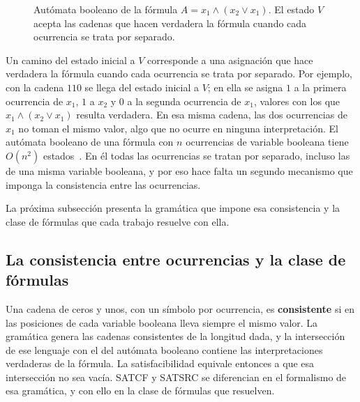 \begin{figure}[ht]
\centering
{}
\caption[Autómata booleano de $A = x_1 \wedge (x_2 \vee x_1)$]{Autómata booleano de la fórmula $A = x_1 \wedge (x_2 \vee
x_1)$. El estado $V$ acepta las cadenas que hacen verdadera la fórmula
cuando cada ocurrencia se trata por separado.}
\label{fig:automata-booleano}
\end{figure}

Un camino del estado inicial a $V$ corresponde a una asignación que hace
verdadera la fórmula cuando cada ocurrencia se trata por separado. Por
ejemplo, con la cadena $110$ se llega del estado inicial a $V$; en ella
se asigna $1$ a la primera ocurrencia de $x_1$, $1$ a $x_2$ y $0$ a la
segunda ocurrencia de $x_1$, valores con los que $x_1 \wedge (x_2 \vee
x_1)$ resulta verdadera. En esa misma cadena, las dos ocurrencias de
$x_1$ no toman el mismo valor, algo que no ocurre en ninguna interpretación.
El autómata booleano de una fórmula con $n$ ocurrencias de variable booleana
tiene $O(n^2)$ estados~\cite{fernandezarias2007}. En él todas las
ocurrencias se tratan por separado, incluso las de una misma variable booleana, y
por eso hace falta un segundo mecanismo que imponga la consistencia
entre las ocurrencias.

La próxima subsección presenta la gramática que impone esa consistencia
y la clase de fórmulas que cada trabajo resuelve con ella.

\subsection{La consistencia entre ocurrencias y la clase de fórmulas}
\label{subsec:consistencia-clase}

Una cadena de ceros y unos, con un símbolo por
ocurrencia, es \textbf{consistente} si en las posiciones de cada variable booleana
lleva siempre el mismo valor. La gramática genera las cadenas
consistentes de la longitud dada, y la intersección de ese lenguaje con
el del autómata booleano contiene las interpretaciones verdaderas de la
fórmula. La satisfacibilidad equivale entonces a que esa intersección no
sea vacía. SATCF y SATSRC se diferencian en el formalismo de esa
gramática, y con ello en la clase de fórmulas que resuelven.

